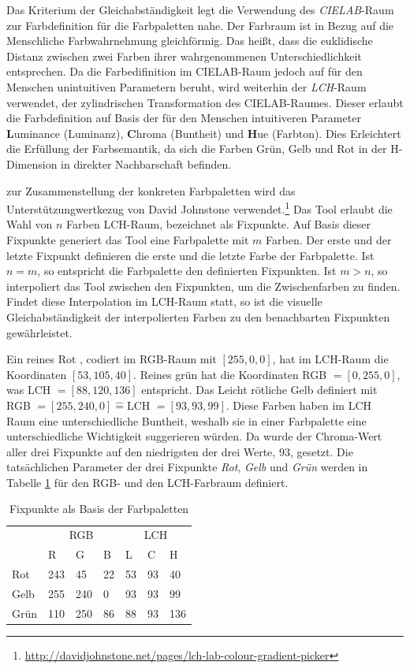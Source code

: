 Das Kriterium der Gleichabständigkeit legt die Verwendung des \emph{CIELAB}-Raum zur Farbdefinition für die Farbpaletten nahe. Der Farbraum ist in Bezug auf die Menschliche Farbwahrnehmung gleichförmig. Das heißt, dass die euklidische Distanz zwischen zwei Farben ihrer wahrgenommenen Unterschiedlichkeit entsprechen. Da die Farbedifinition im CIELAB-Raum jedoch auf für den Menschen unintuitiven Parametern beruht, wird weiterhin der \emph{LCH}-Raum verwendet, der zylindrischen Transformation des CIELAB-Raumes. Dieser erlaubt die Farbdefinition auf Basis der für den Menschen intuitiveren Parameter \textbf{L}uminance (Luminanz), \textbf{C}hroma (Buntheit) und \textbf{H}ue (Farbton). Dies Erleichtert die Erfüllung der Farbsemantik, da sich die Farben Grün, Gelb und Rot in der H-Dimension in direkter Nachbarschaft befinden. 

zur Zusammenstellung der konkreten Farbpaletten wird das Unterstützungwertkezug von David Johnstone verwendet.\footnote{\url{http://davidjohnstone.net/pages/lch-lab-colour-gradient-picker}} Das Tool erlaubt die Wahl von $n$ Farben LCH-Raum, bezeichnet als \glqq Fixpunkte\grqq. Auf Basis dieser Fixpunkte generiert das Tool eine Farbpalette mit $m$ Farben. Der erste und der letzte Fixpunkt definieren die erste und die letzte Farbe der Farbpalette. Ist $n = m$, so entspricht die Farbpalette den definierten Fixpunkten. Ist $m > n$, so interpoliert das Tool zwischen den Fixpunkten, um die Zwischenfarben zu finden. Findet diese Interpolation im LCH-Raum statt, so ist die visuelle Gleichabständigkeit der interpolierten Farben zu den benachbarten Fixpunkten gewährleistet.

Ein \glqq reines Rot \grqq, codiert im RGB-Raum mit $[255,0,0]$, hat im LCH-Raum die Koordinaten $[53,105,40]$. \glqq Reines grün\grqq{} hat die Koordinaten RGB $=[0,255,0]$, was LCH $= [88,120,136]$ entspricht. Das \glqq Leicht rötliche Gelb\grqq{} definiert mit RGB $=[255,240,0] \hat{=}$LCH $= [93,93,99]$. Diese Farben haben im LCH Raum eine unterschiedliche Buntheit, weshalb  sie in einer  Farbpalette eine unterschiedliche Wichtigkeit suggerieren würden. Da wurde der Chroma-Wert aller drei Fixpunkte auf den niedrigsten der drei Werte, $93$, gesetzt. Die tatsächlichen Parameter der drei Fixpunkte \emph{Rot}, \emph{Gelb} und \emph{Grün} werden in Tabelle \ref{tab:fixpoints} für den RGB- und den LCH-Farbraum definiert. 

\begin{table}[h]
\centering
\caption{Fixpunkte als Basis der Farbpaletten}
\label{tab:fixpoints}
\begin{tabular}{@{}lllllll@{}}
\toprule
     & \multicolumn{3}{c}{RGB} & \multicolumn{3}{c}{LCH} \\ 
     & R      & G      & B     & L      & C     & H      \\ \midrule
Rot  & 243    & 45     & 22    & 53     & 93    & 40     \\
Gelb & 255    & 240    & 0     & 93     & 93    & 99     \\
Grün & 110    & 250    & 86    & 88     & 93    & 136    \\ \bottomrule
\end{tabular}
\end{table}

